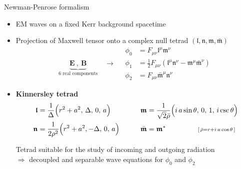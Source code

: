 \documentclass[9pt]{beamer}
\begin{document}
\begin{frame}{Newman-Penrose formalism}    
    \begin{itemize}
        \setlength\itemsep{1.2em}
        \item EM waves on a fixed Kerr background spacetime

        \item Projection of Maxwell tensor onto a complex null tetrad
        $(\bm{\mathfrak{l}},\bm{\mathfrak{n}},\bm{\mathfrak{m}},\bar{\bm{\mathfrak{m}}})$
        \begin{equation*}
            \underbrace{\mathbf{E} ~,~ \mathbf{B}}_\text{6 real components}
            \quad\longrightarrow\quad
            \boxed{
            \begin{aligned}
                \phi_0 &= F_{\mu\nu} \mathfrak{l}^\mu \mathfrak{m}^\nu \\
                \phi_1 &= \tfrac{1}{2} F_{\mu\nu} ( \mathfrak{l}^\mu \mathfrak{n}^\nu - \mathfrak{m}^\mu \bar{\mathfrak{m}}^\nu ) \\
                \phi_2 &= F_{\mu\nu} \bar{\mathfrak{m}}^\mu \mathfrak{n}^\nu 
            \end{aligned}
            }
        \end{equation*}
		
		\item \textbf{Kinnersley tetrad}
		\begin{alignat*}{3}
		\bm{\mathfrak{l}} &= \frac{1}{\Delta} \Big( r^2+a^2, \,\Delta, \,0, \,a \Big)&& \qquad\bm{\mathfrak{\texttt{}m}} = \frac{1}{\sqrt{2} \bar{\rho}} \Big( i \,a \sin\theta, \,0, \,1, \,i \csc\theta \Big) \\
		\bm{\mathfrak{n}} &= \frac{1}{2 \rho^2} \Big( r^2+a^2, -\Delta, \,0, \,a \Big) && \qquad\bar{\bm{\mathfrak{m}}} = \bm{\mathfrak{m}}^*
		\hspace*{1.6cm} {\scriptstyle [\,\bar{\rho} = r + i \,a \cos\theta \,]}
		\end{alignat*}
	
		Tetrad suitable for the study of incoming and outgoing radiation\\ $ \Rightarrow $ 
		\alert{decoupled and separable wave equations for $\phi_0$ and $\phi_2$}


\end{itemize}
\end{frame}
\end{document}
